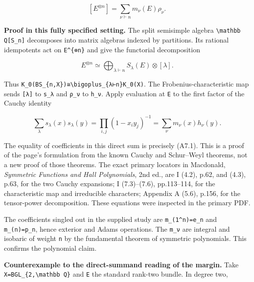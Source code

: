 \documentclass[
  10pt,
]{article}
\begin{document}
\[
[E^{\otimes n}]=\sum_{\nu\vdash n}m_\nu(E)\rho_\nu.
\tag{A7.1}
\]

\textbf{Proof in this fully specified setting.} The split semisimple
algebra
\texttt{\small \textbackslash{}mathbb Q[\allowbreak{}S\_\allowbreak{}n]\allowbreak{}}
decomposes into matrix algebras indexed by partitions. Its rational
idempotents act on
\texttt{\small E\textasciicircum{}\{⊗\allowbreak{}n\}} and give the
functorial decomposition

\[
E^{\otimes n}\simeq\bigoplus_{\lambda\vdash n}S_\lambda(E)\otimes[\lambda].
\tag{A7.2}
\]

Thus
\texttt{\small K\_\allowbreak{}0(\allowbreak{}BS\_\allowbreak{}\{n,\allowbreak{}X\})\allowbreak{}≅\textbackslash{}bigoplus\_\allowbreak{}\{λ⊢n\}K\_\allowbreak{}0(\allowbreak{}X)\allowbreak{}}.
The Frobenius-characteristic map sends
\texttt{\small [\allowbreak{}λ]\allowbreak{}} to
\texttt{\small s\_\allowbreak{}λ} and \texttt{\small ρ\_\allowbreak{}ν}
to \texttt{\small h\_\allowbreak{}ν}. Apply evaluation at
\texttt{\small E} to the first factor of the Cauchy identity

\[
\sum_\lambda s_\lambda(x)s_\lambda(y)
=\prod_{i,j}(1-x_i y_j)^{-1}
=\sum_\nu m_\nu(x)h_\nu(y).
\]

The equality of coefficients in this direct sum is precisely (A7.1).
This is a proof of the page's formulation from the known Cauchy and
Schur--Weyl theorems, not a new proof of those theorems. The exact
primary locators in Macdonald, \emph{Symmetric Functions and Hall
Polynomials}, 2nd ed., are I (4.2), p.62, and (4.3), p.63, for the two
Cauchy expansions; I (7.3)--(7.6), pp.113--114, for the characteristic
map and irreducible characters; Appendix A (5.6), p.156, for the
tensor-power decomposition. These equations were inspected in the
primary PDF.

The coefficients singled out in the supplied study are
\texttt{\small m\_\allowbreak{}(\allowbreak{}1\textasciicircum{}n)\allowbreak{}=\allowbreak{}e\_\allowbreak{}n}
and
\texttt{\small m\_\allowbreak{}(\allowbreak{}n)\allowbreak{}=\allowbreak{}p\_\allowbreak{}n},
hence exterior and Adams operations. The
\texttt{\small m\_\allowbreak{}ν} are integral and isobaric of weight
\texttt{\small n} by the fundamental theorem of symmetric polynomials.
This confirms the polynomial claim.

\textbf{Counterexample to the direct-summand reading of the margin.}
Take
\texttt{\small X=\allowbreak{}BGL\_\allowbreak{}\{2,\allowbreak{}\textbackslash{}mathbb Q\}}
and \texttt{\small E} the standard rank-two bundle. In degree two,
\end{document}
